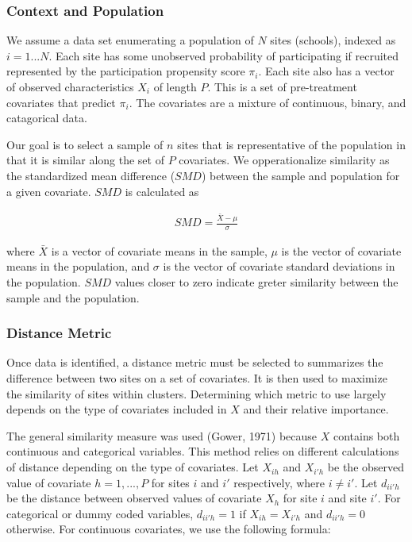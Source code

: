\documentclass[man,floatsintext]{apa6}
\begin{document}
\hypertarget{context-and-population}{%
\subsubsection{Context and Population}\label{context-and-population}}

We assume a data set enumerating a population of \(N\) sites (schools), indexed as \(i = 1 ... N\). Each site has some unobserved probability of participating if recruited represented by the participation propensity score \(\pi_i\). Each site also has a vector of observed characteristics \(X_i\) of length \(P\). This is a set of pre-treatment covariates that predict \(\pi_i\). The covariates are a mixture of continuous, binary, and catagorical data.

Our goal is to select a sample of \(n\) sites that is representative of the population in that it is similar along the set of \(P\) covariates. We opperationalize similarity as the standardized mean difference (\(SMD\)) between the sample and population for a given covariate. \(SMD\) is calculated as

\begin{align}
  SMD = \frac{\bar{X}-\mu}{\sigma}
\end{align}

where \(\bar{X}\) is a vector of covariate means in the sample, \(\mu\) is the vector of covariate means in the population, and \(\sigma\) is the vector of covariate standard deviations in the population. \(SMD\) values closer to zero indicate greter similarity between the sample and the population.

\hypertarget{distance-metric}{%
\subsubsection{Distance Metric}\label{distance-metric}}

Once data is identified, a distance metric must be selected to summarizes the difference between two sites on a set of covariates. It is then used to maximize the similarity of sites within clusters. Determining which metric to use largely depends on the type of covariates included in \(X\) and their relative importance.

The general similarity measure was used (Gower, 1971) because \(X\) contains both continuous and categorical variables. This method relies on different calculations of distance depending on the type of covariates. Let \(X_{ih}\) and \(X_{i'h}\) be the observed value of covariate \(h = {1, ..., P}\) for sites \(i\) and \(i'\) respectively, where \(i \ne i'\). Let \(d_{ii'h}\) be the distance between observed values of covariate \(X_{h}\) for site \(i\) and site \(i'\). For categorical or dummy coded variables, \(d_{ii'h} = 1\) if \(X_{ih} = X_{i'h}\) and \(d_{ii'h} = 0\) otherwise. For continuous covariates, we use the following formula:
\end{document}
